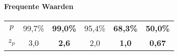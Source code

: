   \paragraph{Frequente Waarden}
  \label{sec:FrequenteWaardenVoorZ}
    \begin{tabular}{|c||ccccc|}
      \hline
        {\bf $p$}   & 99,7\%     & {\bf 99,0\%}     &  95,4\%       & {\bf 68,3\%}       & {\bf 50,0\%}        \\
        {\bf $z_p$} & 3,0        & {\bf 2,6 }       &  2,0          & {\bf 1,0 }         & {\bf 0,67 }         \\
      \hline
    \end{tabular}
